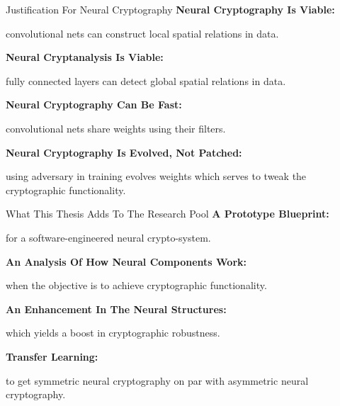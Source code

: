 \documentclass{beamer}
\begin{document}
		\begin{frame}{Justification For Neural Cryptography}
			 \vfill
			 \textbf{Neural Cryptography Is Viable:}\\\vfill
			 \hfill\begin{minipage}{0.93\textwidth}
			 	convolutional nets can construct local spatial relations in data.
			 \end{minipage}
			 \vfill
			 \textbf{Neural Cryptanalysis Is Viable:}\\\vfill
			 \hfill\begin{minipage}{0.93\textwidth}
			 	fully connected layers can detect global spatial relations in data.
			 \end{minipage}
			 \vfill
			 \textbf{Neural Cryptography Can Be Fast:}\\\vfill
			 \hfill\begin{minipage}{0.93\textwidth}
			 	convolutional nets share weights using their filters.
			 \end{minipage}
			 \vfill
			 \textbf{Neural Cryptography Is Evolved, Not Patched:}\\\vfill
			 \hfill\begin{minipage}{0.93\textwidth}
			 	using adversary in training evolves weights which serves to tweak the cryptographic functionality.
			 \end{minipage}
		\end{frame}
		\begin{frame}{What This Thesis Adds To The Research Pool}
			\vfill
			\textbf{A Prototype Blueprint:}\\\vspace{0.1cm}
			\hfill\begin{minipage}{0.93\textwidth}
				for a software-engineered neural crypto-system.
			\end{minipage}
			\vfill
			\textbf{An Analysis Of How Neural Components Work:}\\\vfill
			\hfill\begin{minipage}{0.93\textwidth}
				when the objective is to achieve cryptographic functionality.
			\end{minipage}
			\vfill
			\textbf{An Enhancement In The Neural Structures:}\\\vfill
			\hfill\begin{minipage}{0.93\textwidth}
				which yields a boost in cryptographic robustness.
			\end{minipage}
			\vfill
			\textbf{Transfer Learning:}\\\vfill
			\hfill\begin{minipage}{0.93\textwidth}
				to get symmetric neural cryptography on par with asymmetric neural cryptography.
			\end{minipage}
		\end{frame}
\end{document}

